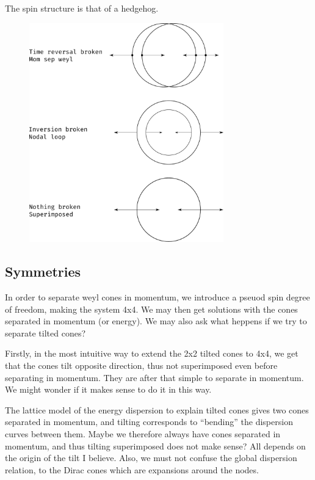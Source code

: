 The spin structure is that of a hedgehog.

\begin{figure}[ht]
  \centering
  \includegraphics[width=0.75\textwidth]{figures/spinStructureWeyl}
  \caption{\label{fig:spinStructure} }
\end{figure}



\subsection{Symmetries}
In order to separate weyl cones in momentum, we introduce a pseuod spin degree of freedom, making the system 4x4.
We may then get solutions with the cones separated in momentum (or energy).
We may also ask what heppens if we try to separate tilted cones?

Firstly, in the most intuitive way to extend the 2x2 tilted cones to 4x4, we get that the cones tilt opposite direction, thus not superimposed even before separating in momentum.
They are after that simple to separate in momentum.
We might wonder if it makes sense to do it in this way.

The lattice model of the energy dispersion to explain tilted cones gives two cones separated in momentum, and tilting corresponds to ``bending'' the dispersion curves between them.
Maybe we therefore always have cones separated in momentum, and thus tilting superimposed does not make sense?
All depends on the origin of the tilt I believe.
Also, we must not confuse the global dispersion relation, to the Dirac cones which are expansions around the nodes.

